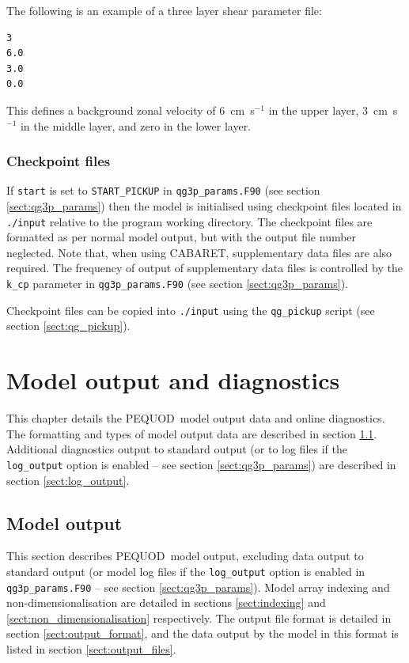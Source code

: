 \documentclass[a4paper]{book}
\newcommand{\pequod}{PEQUOD}
\begin{document}
The following is an example of a three layer shear parameter file:
\begin{lstlisting}[language = sh, frame = single]
3
6.0
3.0
0.0
\end{lstlisting}
This defines a background zonal velocity of 6~cm~s${}^{-1}$ in the upper layer,
3~cm~s${}^{-1}$ in the middle layer, and zero in the lower layer.

\subsection{Checkpoint files}\label{sect:checkpoint_files}

If \verb+start+ is set to \verb+START_PICKUP+ in \verb+qg3p_params.F90+ (see
section \ref{sect:qg3p_params}) then the model is initialised using checkpoint
files located in \verb+./input+ relative to the program working directory.
The checkpoint files are formatted as per normal model output, but with the
output file number neglected. Note that, when using CABARET, supplementary
data files are also required. The frequency of output of supplementary data
files is controlled by the \verb+k_cp+ parameter in \verb+qg3p_params.F90+ (see
section \ref{sect:qg3p_params}).

Checkpoint files can be copied into \verb+./input+ using the \verb+qg_pickup+
script (see section \ref{sect:qg_pickup}).

\chapter{Model output and diagnostics}

This chapter details the \pequod\ model output data and online diagnostics. The
formatting and types of model output data are described in section
\ref{sect:output}. Additional diagnostics output to standard output (or to
log files if the \verb+log_output+ option is enabled -- see section
\ref{sect:qg3p_params}) are described in section \ref{sect:log_output}.

\section{Model output}\label{sect:output}

This section describes \pequod\ model output, excluding data output to standard
output (or model log files if the \verb+log_output+ option is enabled in
\linebreak \verb+qg3p_params.F90+ -- see section \ref{sect:qg3p_params}).
Model array indexing and \linebreak non-dimensionalisation are detailed in
sections \ref{sect:indexing} and \ref{sect:non_dimensionalisation} respectively.
The output file format is detailed in section \ref{sect:output_format}, and the
data output by the model in this format is listed in section
\ref{sect:output_files}.
\end{document}
